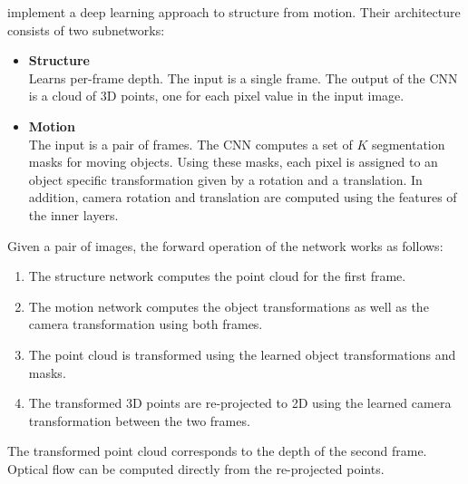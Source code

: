 		\cite{SFMNET} implement a deep learning approach to structure from motion. 
		Their architecture consists of two subnetworks:
		\begin{itemize}
			\item \textbf{Structure}
				\\
				Learns per-frame depth.
				The input is a single frame. 
				The output of the CNN is a cloud of 3D points, one for each pixel value in the input image.
			\item \textbf{Motion}
				\\
				The input is a pair of frames.
				The CNN computes a set of $K$ segmentation masks for moving objects. 
				Using these masks, each pixel is assigned to an object specific transformation given by a rotation and a translation.
				In addition, camera rotation and translation are computed using the features of the inner layers.
		\end{itemize}
		Given a pair of images, the forward operation of the network works as follows:
		\begin{enumerate}
			\item The structure network computes the point cloud for the first frame.
			\item The motion network computes the object transformations as well as the camera transformation using both frames.
			\item The point cloud is transformed using the learned object transformations and masks.
			\item The transformed 3D points are re-projected to 2D using the learned camera transformation between the two frames.
		\end{enumerate}
		The transformed point cloud corresponds to the depth of the second frame.
		Optical flow can be computed directly from the re-projected points.
		
